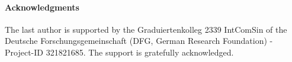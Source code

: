 \documentclass[a4paper,11pt]{article}
\theoremstyle{remark}
\begin{document}
\paragraph{Acknowledgments}
The last author is supported by the Graduiertenkolleg 2339 IntComSin of the Deutsche Forschungsgemeinschaft (DFG, German Research Foundation) - Project-ID 321821685. The support is gratefully acknowledged.

  
\newpage 

\end{document}
